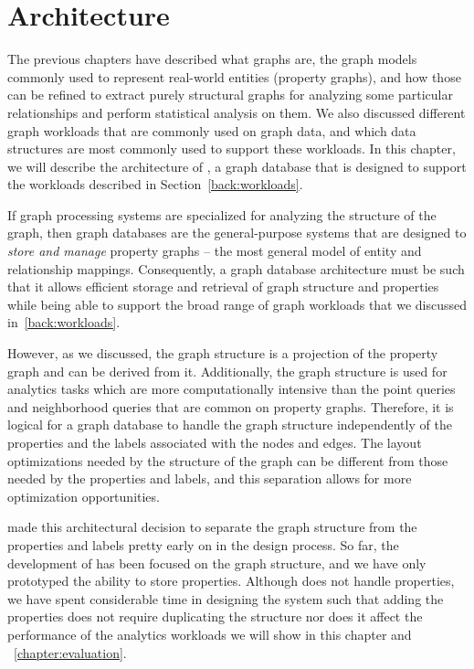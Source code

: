 \chapter{\project{} Architecture}
\label{chapter:architecture}

The previous chapters have described what graphs are, the graph models commonly used to represent real-world entities (property graphs), and how those can be refined to extract purely structural graphs for analyzing some particular relationships and perform statistical analysis on them. 
We also discussed different graph workloads that are commonly used on graph data, and which data structures are most commonly used to support these workloads.
In this chapter, we will describe the architecture of \project{}, a graph database that is designed to support the workloads described in Section~\autoref{back:workloads}.

If graph processing systems are specialized for analyzing the structure of the graph, then graph databases are the general-purpose systems that are designed to \emph{store and manage} property graphs -- the most general model of entity and relationship mappings.
Consequently, a graph database architecture must be such that it allows efficient storage and retrieval of graph structure and properties while being able to support the broad range of graph workloads that we discussed in~\autoref{back:workloads}.

However, as we discussed, the graph structure is a projection of the property graph and can be derived from it. 
Additionally, the graph structure is used for analytics tasks which are more computationally intensive than the point queries and neighborhood queries that are common on property graphs.
Therefore, it is logical for a graph database to handle the graph structure independently of the properties and the labels associated with the nodes and edges.
The layout optimizations needed by the structure of the graph can be different from those needed by the properties and labels, and this separation allows for more optimization opportunities.

\project{} made this architectural decision to separate the graph structure from the properties and labels pretty early on in the design process.
So far, the development of \project{} has been focused on the graph structure, and we have only prototyped the ability to store properties.
Although \project{} does not handle properties, we have spent considerable time in designing the system such that adding the properties does not require duplicating the structure nor does it affect the performance of the analytics workloads we will show in this chapter and ~\autoref{chapter:evaluation}.


